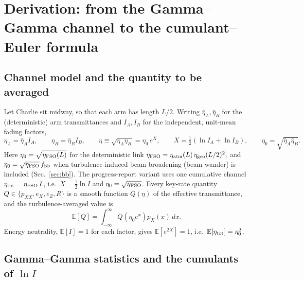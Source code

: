 \documentclass[11pt,a4paper]{article}
\theoremstyle{plain}
\theoremstyle{remark}
\begin{document}
\section{Derivation: from the Gamma--Gamma channel to the cumulant--Euler formula}
\label{sec:derivation}

\subsection{Channel model and the quantity to be averaged}

Let Charlie sit midway, so that each arm has length $L/2$. Writing $\bar\eta_{A},\bar\eta_{B}$ for the (deterministic) arm transmittances and $I_A,I_B$ for the independent, unit-mean fading factors,
\begin{equation}
  \eta_A=\bar\eta_A I_A,\qquad \eta_B=\bar\eta_B I_B,\qquad
  \eta\equiv\sqrt{\eta_A\eta_B}=\eta_0\,e^{X},\qquad
  X=\tfrac12(\ln I_A+\ln I_B),\qquad \eta_0=\sqrt{\bar\eta_A\bar\eta_B}.
  \label{eq:model}
\end{equation}
Here $\eta_0=\sqrt{\eta_{\rm FSO}(L)}$ for the deterministic link $\eta_{\rm FSO}=\eta_{\rm atm}(L)\,\eta_{\rm geo}(L/2)^2$, and $\eta_0=\sqrt{\eta_{\rm FSO}}\,f_{\rm bb}$ when turbulence-induced beam broadening (beam wander) is included (Sec.~\ref{sec:bb}). The progress-report variant uses one cumulative channel $\eta_{\rm tot}=\eta_{\rm FSO}\,I$, i.e.\ $X=\tfrac12\ln I$ and $\eta_0=\sqrt{\eta_{\rm FSO}}$.
Every key-rate quantity $Q\in\{p_{XX},e_X,e_Z,R\}$ is a smooth function $Q(\eta)$ of the effective transmittance, and the turbulence-averaged value is
\begin{equation}
  \mathbb E[Q]=\int_{-\infty}^{\infty}Q\!\left(\eta_0e^{x}\right)p_X(x)\,dx .
  \label{eq:avg}
\end{equation}
Energy neutrality, $\mathbb E[I]=1$ for each factor, gives $\mathbb E[e^{2X}]=1$, i.e.\ $\mathbb E[\eta_{\rm tot}]=\eta_0^2$.

\subsection{Gamma--Gamma statistics and the cumulants of $\ln I$}
\label{sec:ggstats}
\end{document}
